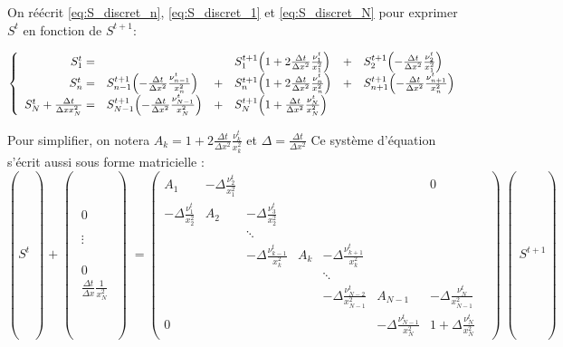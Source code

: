 On réécrit \eqref{eq:S_discret_n}, \eqref{eq:S_discret_1} et
\eqref{eq:S_discret_N} pour exprimer $S^t$ en fonction de $S^{t+1}$:

\begin{equation}
  \left\lbrace\begin{array}{r l c l c l }
    S^{t}_1 = &
               & &S_1^{t+1}\left(1 + 2\frac{\Delta t}{\Delta x^2}\frac{\nu_1^t}{x_1^2}\right)
               &+& S_{2}^{t+1}\left(-\frac{\Delta t}{\Delta x^2}\frac{\nu_{2}^t}{x_1^2}\right)\\
    S^{t}_n = &S_{n-1}^{t+1}\left(-\frac{\Delta t}{\Delta x^2}\frac{\nu_{n-1}^t}{x_n^2}\right)
               &+& S_n^{t+1}\left(1 + 2\frac{\Delta t}{\Delta x^2}\frac{\nu_n^t}{x_n^2}\right)
               &+& S_{n+1}^{t+1}\left(-\frac{\Delta t}{\Delta x^2}\frac{\nu_{n+1}^t}{x_n^2}\right)\\
    S^{t}_N + \frac{\Delta t}{\Delta x x_N^2} =
               &S^{t+1}_{N-1} \left(-\frac{\Delta t}{\Delta x^2}\frac{\nu_{N-1}^t}{x_N^2}\right)
               &+& S_N^{t+1} \left(1 + \frac{\Delta t}{\Delta x^2}\frac{\nu^t_N}{x_N^2}\right)
               & &
  \end{array}\right.
\end{equation}

Pour simplifier, on notera $A_k = 1 + 2 \frac{\Delta t}{\Delta x^2}\frac{\nu_k^t}{x_k^2}$ et $\Delta = \frac{\Delta t}{\Delta x^2}$
Ce système d'équation s'écrit aussi sous forme matricielle :
\begin{equation}
  \left(S^t\middle) + 
  \middle(\begin{matrix}
    0 \\
    \\
    \\
    \vdots \\
    \\
    \\
    \\
    0 \\
    \frac{\Delta t}{\Delta x}\frac{1}{x_N^2}
  \end{matrix}\middle)
  =
  \begin{pmatrix}
A_1                            & -\Delta\frac{\nu_{2}^t}{x_1^2} &  & & & & 0\\
-\Delta \frac{\nu_{1}^t}{x_2^2} & A_2                           & -\Delta\frac{\nu_{3}^t}{x_2^2} & & & &\\
    &        & \ddots                          &  & & & &\\
    &        & -\Delta \frac{\nu_{k-1}^t}{x_k^2} & A_k    & -\Delta \frac{\nu_{k+1}^t}{x_k^2} & &\\
    &        &                                 & & \ddots                          & & \\
    & & & & -\Delta \frac{\nu_{N-2}^t}{x_{N-1}^2} & A_{N-1} & -\Delta \frac{\nu_{N}^t}{x_{N-1}^2}\\
    0 & & & & & -\Delta \frac{\nu_{N-1}^t}{x_N^2} & 1 + \Delta \frac{\nu_N^t}{x_N^2}
  \end{pmatrix} \middle(S^{t+1}\right)
\end{equation}

